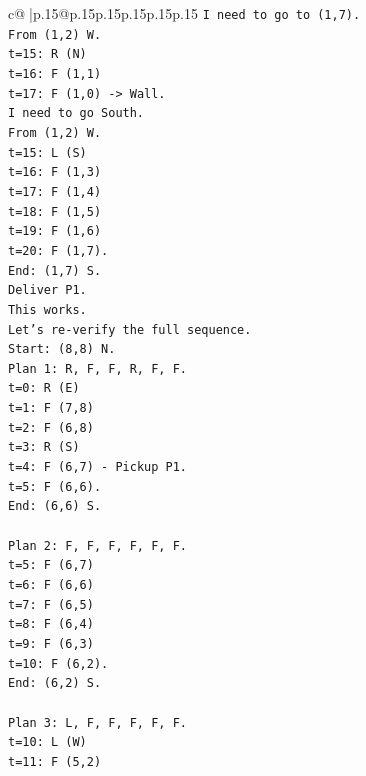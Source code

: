 \documentclass{article}
\begin{document}
{\begin{supertabular}{c@{$\;$}|p{.15\linewidth}@{}p{.15\linewidth}p{.15\linewidth}p{.15\linewidth}p{.15\linewidth}p{.15\linewidth}}
{{{\texttt{I need to go to (1,7).} \\
\texttt{From (1,2) W.} \\
\texttt{t=15: R (N)} \\
\texttt{t=16: F (1,1)} \\
\texttt{t=17: F (1,0) {-}> Wall.} \\
\texttt{I need to go South.} \\
\texttt{From (1,2) W.} \\
\texttt{t=15: L (S)} \\
\texttt{t=16: F (1,3)} \\
\texttt{t=17: F (1,4)} \\
\texttt{t=18: F (1,5)} \\
\texttt{t=19: F (1,6)} \\
\texttt{t=20: F (1,7).} \\
\texttt{End: (1,7) S.} \\
\texttt{Deliver P1.} \\
\texttt{This works.} \\
\texttt{Let's re{-}verify the full sequence.} \\
\texttt{Start: (8,8) N.} \\
\texttt{Plan 1: R, F, F, R, F, F.} \\
\texttt{t=0: R (E)} \\
\texttt{t=1: F (7,8)} \\
\texttt{t=2: F (6,8)} \\
\texttt{t=3: R (S)} \\
\texttt{t=4: F (6,7) {-} Pickup P1.} \\
\texttt{t=5: F (6,6).} \\
\texttt{End: (6,6) S.} \\
\\ 
\texttt{Plan 2: F, F, F, F, F, F.} \\
\texttt{t=5: F (6,7)} \\
\texttt{t=6: F (6,6)} \\
\texttt{t=7: F (6,5)} \\
\texttt{t=8: F (6,4)} \\
\texttt{t=9: F (6,3)} \\
\texttt{t=10: F (6,2).} \\
\texttt{End: (6,2) S.} \\
\\ 
\texttt{Plan 3: L, F, F, F, F, F.} \\
\texttt{t=10: L (W)} \\
\texttt{t=11: F (5,2)} \\
}}}
\end{supertabular}}
\end{document}
